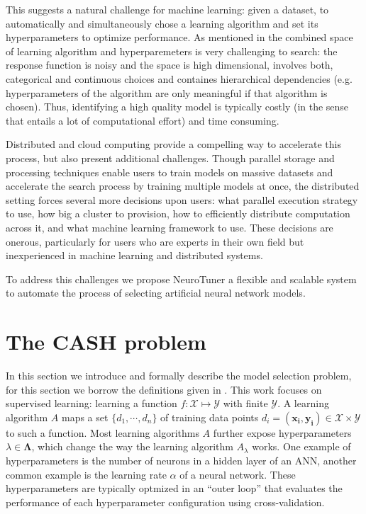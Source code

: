 \documentclass{article}
\begin{document}
This suggests a natural challenge for machine learning: given a dataset, to automatically and simultaneously chose a learning algorithm and set its hyperparameters to optimize performance. As mentioned in \cite{Hall2009} the combined space of learning algorithm and hyperparemeters is very challenging to search: the response function is noisy and the space is high dimensional, involves both, categorical and continuous choices and containes hierarchical dependencies (e.g. hyperparameters of the algorithm are only meaningful if that algorithm is chosen). Thus, identifying a high quality model is typically costly (in the sense that entails a lot of computational effort) and time consuming.

Distributed and cloud computing provide a compelling way to accelerate this process, but also present additional challenges. Though parallel storage and processing techniques enable users to train models on massive datasets and accelerate the search process by training multiple models at once, the distributed setting forces several more decisions upon users: what parallel execution strategy to use, how big a cluster to provision, how to efficiently distribute computation across it, and what machine learning framework to use. These decisions are onerous, particularly for users who are experts in their own field but inexperienced in machine learning and distributed systems.

To address this challenges we propose NeuroTuner a flexible and scalable system to automate the process of selecting artificial neural network models.


\section{The CASH problem}
\label{sec:model_selection}

In this section we introduce and formally describe the model selection problem, for this section we borrow the definitions given in \cite{Thornton2013}. This work focuses on supervised learning: learning a function $f: \mathcal{X} \mapsto \mathcal{Y}$ with finite $\mathcal{Y}$. A learning algorithm $A$ maps a set $\{d_1, \cdots, d_n\}$ of training data points $d_i = (\mathbf{x_i}, \mathbf{y_i}) \in \mathcal{X} \times \mathcal{Y}$ to such a function. Most learning algorithms $A$ further expose hyperparameters $\lambda \in \mathbf{\Lambda}$, which change the way the learning algorithm $A_{\lambda}$ works. One example of hyperparameters is the number of neurons in a hidden layer of an ANN, another common example is the learning rate $\alpha$ of a neural network. These hyperparameters are typically optmized in an ``outer loop'' that evaluates the performance of each hyperparameter configuration using cross-validation.
\end{document}
